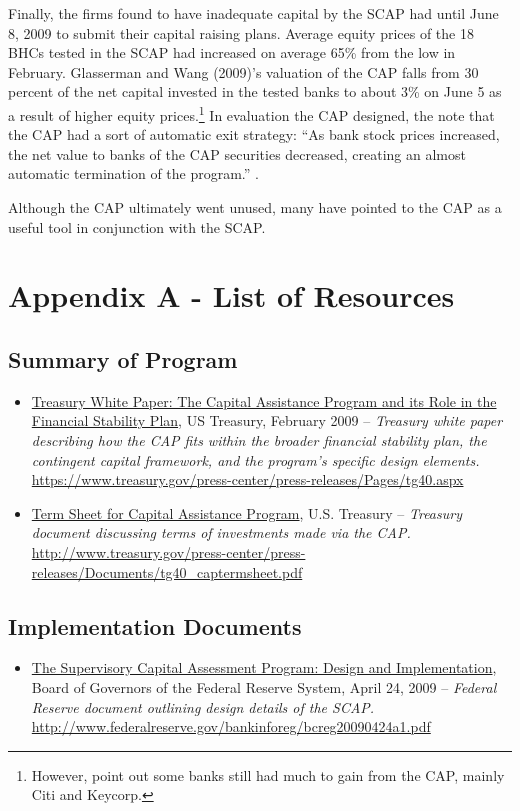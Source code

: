 \documentclass[12pt]{article}
\begin{document}
Finally, the firms found to have inadequate capital by the SCAP had until June 8, 2009 to submit their capital raising plans. Average equity prices of the 18 BHCs tested in the SCAP had increased on average 65\% from the low in February. Glasserman and Wang (2009)'s valuation of the CAP falls from 30 percent  of the net capital invested in the tested banks to about 3\% on June 5 as a result of higher equity prices.\footnote{However, \citet{GW} point out some banks still had much to gain from the CAP, mainly Citi and Keycorp.} In evaluation the CAP designed, the note that the CAP had a sort of automatic exit strategy: “As bank stock prices increased, the net value to banks of the CAP securities decreased, creating an almost automatic termination of the program.'' \citep{GW}.

Although the CAP ultimately went unused, many have pointed to the CAP as a useful tool in conjunction with the SCAP.



\nocite{*}


\section{Appendix A - List of Resources}

\subsection{Summary of Program}

\begin{itemize}

\item
\ul{Treasury White Paper: The Capital Assistance Program and its Role in the Financial Stability Plan}, US Treasury, February 2009 -- \emph{Treasury white paper describing how the CAP fits within the broader financial stability plan, the contingent capital framework, and the program's specific design elements.} \url{https://www.treasury.gov/press-center/press-releases/Pages/tg40.aspx}
\item
\ul{Term
  Sheet for Capital Assistance Program}, U.S. Treasury -- \emph{Treasury
  document discussing terms of investments made via the CAP.} \url{http://www.treasury.gov/press-center/press-releases/Documents/tg40_captermsheet.pdf}
\end{itemize}

\subsection{Implementation Documents}
\begin{itemize}
\item
\ul{The
  Supervisory Capital Assessment Program: Design and Implementation},
  Board of Governors of the Federal Reserve System, April 24, 2009 -- \emph{Federal Reserve document outlining design details of the SCAP.} \url{http://www.federalreserve.gov/bankinforeg/bcreg20090424a1.pdf}
\end{itemize}
\end{document}
